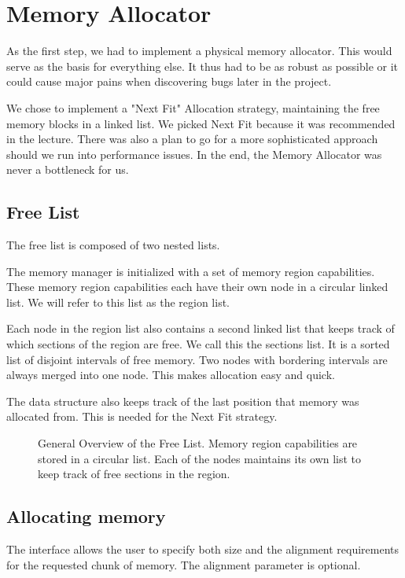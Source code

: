 \chapter{Memory Allocator}

As the first step, we had to implement a physical memory allocator.
This would serve as the basis for everything else. 
It thus had to be as robust as possible or it could cause major pains when discovering bugs later in the project.

We chose to implement a "Next Fit" Allocation strategy, maintaining the free memory blocks in a linked list. We picked Next Fit because it was recommended in the lecture. There was also a plan to go for a more sophisticated approach should we run into performance issues. In the end, the Memory Allocator was never a bottleneck for us.

\section{Free List}
The free list is composed of two nested lists.

The memory manager is initialized with a set of memory region capabilities.
These memory region capabilities each have their own node in a circular linked list.
We will refer to this list as the region list.

Each node in the region list also contains a second linked list that keeps track of which sections of the region are free.
We call this the sections list.
It is a sorted list of disjoint intervals of free memory.
Two nodes with bordering intervals are always merged into one node.
This makes allocation easy and quick.

The data structure also keeps track of the last position that memory was allocated from.
This is needed for the Next Fit strategy.

\begin{figure}[ht]
    \centering
    \scalebox{0.5}{ }

    \caption{General Overview of the Free List. Memory region capabilities are stored in a circular list. Each of the nodes maintains its own list to keep track of free sections in the region.}
    \label{fig:free_list}
\end{figure}

\section{Allocating memory}
The interface allows the user to specify both size and the alignment requirements for the requested chunk of memory.
The alignment parameter is optional.

